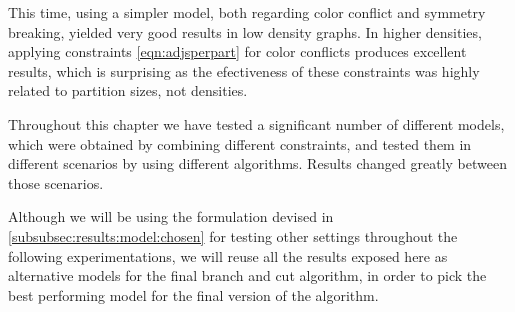 This time, using a simpler model, both regarding color conflict and symmetry breaking, yielded very good results in low density graphs. In higher densities, applying constraints \ref{eqn:adjsperpart} for color conflicts produces excellent results, which is surprising as the efectiveness of these constraints was highly related to partition sizes, not densities.

\spacedhrule
Throughout this chapter we have tested a significant number of different models, which were obtained by combining different constraints, and tested them in different scenarios by using different algorithms. Results changed greatly between those scenarios.

Although we will be using the formulation devised in \ref{subsubsec:results:model:chosen} for testing other settings throughout the following experimentations, we will reuse all the results exposed here as alternative models for the final branch and cut algorithm, in order to pick the best performing model for the final version of the algorithm.

\clearpage